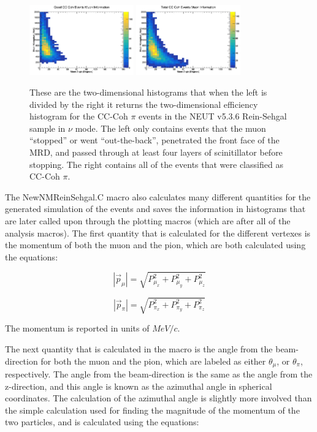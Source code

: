 \documentclass[11pt]{article}
\begin{document}
\begin{figure}[H]
\centering
\includegraphics[width=0.4\textwidth]{NewNMReinSehgalImages/7.png}
\includegraphics[width=0.4\textwidth]{NewNMReinSehgalImages/8.png}
\caption{These are the two-dimensional histograms that when the left is divided by the right it returns the two-dimensional efficiency histogram for the CC-Coh $\pi$ events in the NEUT v5.3.6 Rein-Sehgal sample in $\nu$ mode. The left only contains events that the muon ``stopped'' or went ``out-the-back'', penetrated the front face of the MRD, and passed through at least four layers of scinitillator before stopping. The right contains all of the events that were classified as CC-Coh $\pi$.}
\label{fig:app:NMCCCohMuon2DRS}
\end{figure}

The NewNMReinSehgal.C macro also calculates many different quantities for the generated simulation of the events and saves the information in histograms that are later called upon through the plotting macros (which are after all of the analysis macros). The first quantity that is calculated for the different vertexes is the momentum of both the muon and the pion, which are both calculated using the equations:

\begin{equation}
|\vec{p}_\mu| = \sqrt{P_{\mu_x}^2 + P_{\mu_y}^2 + P_{\mu_z}^2}
\end{equation}

\begin{equation}
|\vec{p}_\pi| = \sqrt{P_{\pi_x}^2 + P_{\pi_y}^2 + P_{\pi_z}^2}
\end{equation}

\noindent
The momentum is reported in units of $MeV/c$.

The next quantity that is calculated in the macro is the angle from the beam-direction for both the muon and the pion, which are labeled as either $\theta_\mu$, or $\theta_\pi$, respectively. The angle from the beam-direction is the same as the angle from the z-direction, and this angle is known as the azimuthal angle in spherical coordinates. The calculation of the azimuthal angle is slightly more involved than the simple calculation used for finding the magnitude of the momentum of the two particles, and is calculated using the equations:
\end{document}
